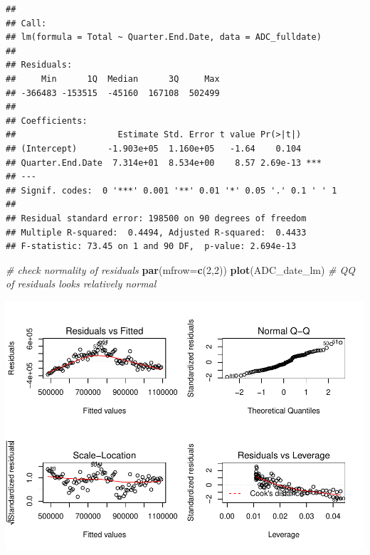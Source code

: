 \documentclass[12pt,]{article}
\newenvironment{Shaded}{\begin{snugshade}}{\end{snugshade}}
\newcommand{\KeywordTok}[1]{\textcolor[rgb]{0.13,0.29,0.53}{\textbf{#1}}}
\newcommand{\DataTypeTok}[1]{\textcolor[rgb]{0.13,0.29,0.53}{#1}}
\newcommand{\DecValTok}[1]{\textcolor[rgb]{0.00,0.00,0.81}{#1}}
\newcommand{\CommentTok}[1]{\textcolor[rgb]{0.56,0.35,0.01}{\textit{#1}}}
\newcommand{\NormalTok}[1]{#1}
\begin{document}
\begin{Shaded}
\end{Shaded}

\begin{verbatim}
## 
## Call:
## lm(formula = Total ~ Quarter.End.Date, data = ADC_fulldate)
## 
## Residuals:
##     Min      1Q  Median      3Q     Max 
## -366483 -153515  -45160  167108  502499 
## 
## Coefficients:
##                    Estimate Std. Error t value Pr(>|t|)    
## (Intercept)      -1.903e+05  1.160e+05   -1.64    0.104    
## Quarter.End.Date  7.314e+01  8.534e+00    8.57 2.69e-13 ***
## ---
## Signif. codes:  0 '***' 0.001 '**' 0.01 '*' 0.05 '.' 0.1 ' ' 1
## 
## Residual standard error: 198500 on 90 degrees of freedom
## Multiple R-squared:  0.4494, Adjusted R-squared:  0.4433 
## F-statistic: 73.45 on 1 and 90 DF,  p-value: 2.694e-13
\end{verbatim}

\begin{Shaded}
\begin{Highlighting}[]
\CommentTok{# check normality of residuals}
\KeywordTok{par}\NormalTok{(}\DataTypeTok{mfrow=}\KeywordTok{c}\NormalTok{(}\DecValTok{2}\NormalTok{,}\DecValTok{2}\NormalTok{))}
\KeywordTok{plot}\NormalTok{(ADC_date_lm) }\CommentTok{# QQ of residuals looks relatively normal}
\end{Highlighting}
\end{Shaded}

\includegraphics{SKo_Project_Template_files/figure-latex/Test2-2.pdf}
\end{document}
